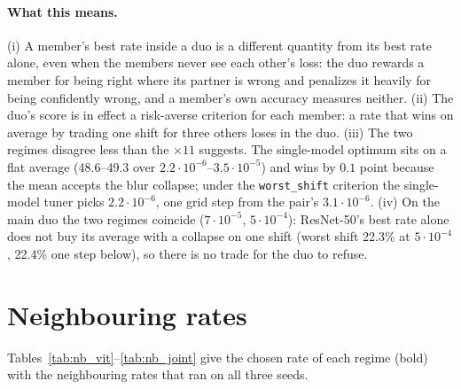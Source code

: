 \documentclass[10pt]{article}
\newcommand{\rl}[1]{\texttt{#1}}
\newcommand{\vit}{ViT-B/16}
\newcommand{\rn}{ResNet-50}
\newcommand{\lr}[2]{\(#1{\cdot}10^{#2}\)}
\begin{document}
\paragraph{What this means.} (i) A member's best rate inside a duo is a different quantity from its best rate alone, even when the members never see each other's loss: the duo rewards a member for being right where its partner is wrong and penalizes it heavily for being confidently wrong, and a member's own accuracy measures neither. (ii) The duo's score is in effect a risk-averse criterion for each member: a rate that wins on average by trading one shift for three others loses in the duo. (iii) The two regimes disagree less than the \(\times 11\) suggests. The single-model optimum sits on a flat average (48.6--49.3 over \(2.2{\cdot}10^{-6}\)--\(3.5{\cdot}10^{-5}\)) and wins by \(0.1\) point because the mean accepts the blur collapse; under the \rl{worst\_shift} criterion the single-model tuner picks \lr{2.2}{-6}, one grid step from the pair's \lr{3.1}{-6}. (iv) On the main duo the two regimes coincide (\lr{7}{-5}, \lr{5}{-4}): \rn{}'s best rate alone does not buy its average with a collapse on one shift (worst shift 22.3\% at \lr{5}{-4}, 22.4\% one step below), so there is no trade for the duo to refuse.

\section{Neighbouring rates}\label{sec:nb}
Tables~\ref{tab:nb_vit}--\ref{tab:nb_joint} give the chosen rate of each regime (bold) with the neighbouring rates that ran on all three seeds.

\begin{table}[H]
  \centering\small
  \caption{\vit{} alone, Tent on its own entropy, on the four tuning shifts (accuracy \%, mean over 3 seeds); bold: the chosen single-model rate.}
  \label{tab:nb_vit}
  
\end{table}

\begin{table}[H]
  \centering\small
  \caption{Independent pair: the duo's accuracy on each tuning shift, and the members' averages, around the chosen pair (bold); mean over 3 seeds. ``ConvNeXt-T blur'' is the member's own accuracy on Gaussian blur (frozen: 20.4).}
  \label{tab:nb_pair}
  \resizebox{\linewidth}{!}{}
\end{table}

\begin{table}[H]
  \centering\small
  \caption{Large adapt: the duo's accuracy on each tuning shift and the \vit{}'s average, around the chosen rate (bold); mean over 3 seeds.}
  \label{tab:nb_large}
  
\end{table}
\end{document}
